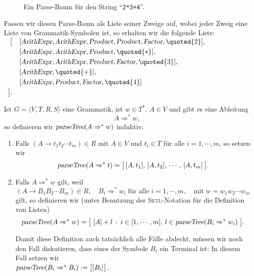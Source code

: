 \begin{figure}[!ht]
  \centering
  \caption{Ein Parse-Baum f\"ur den String ``\texttt{2*3+4}''.}
  \label{fig:parse-tree.dot2}
\end{figure}

Fassen wir diesen Parse-Baum als Liste seiner
Zweige auf, wobei jeder Zweig eine Liste von Grammatik-Symbolen ist, so erhalten wir die folgende Liste:
\\[0.2cm]
\hspace*{1.3cm}
$
\begin{array}[t]{rl}
  \bigl[ 
 & [ \textsl{ArithExpr}, \textsl{ArithExpr}, \textsl{Product}, \textsl{Product}, \textsl{Factor}, \quoted{2} ],
   \\[0.1cm] 
 & [ \textsl{ArithExpr}, \textsl{ArithExpr}, \textsl{Product}, \quoted{*} ],
   \\[0.1cm] 
 & [ \textsl{ArithExpr}, \textsl{ArithExpr}, \textsl{Product}, \textsl{Factor}, \quoted{3} ],
   \\[0.1cm] 
 & [ \textsl{ArithExpr}, \quoted{+} ],
   \\[0.1cm] 
 & [ \textsl{ArithExpr}, \textsl{Product}, \textsl{Factor}, \quoted{4} ]
   \\[0.1cm] 
  \bigr].
\end{array}
$
\pagebreak

\begin{Definition} \lb
Ist $G = \langle V, T, R, S \rangle$ eine Grammatik, ist $w \in T^*$, $A \in V$ und  gibt es eine Ableitung
\[ A \Rightarrow^* w,  \]
so definieren wir $\textsl{parseTree}(A \Rightarrow^* w)$ induktiv:
\begin{enumerate}
\item Falls $(A \rightarrow t_1t_2 \cdots t_m)\in R$ mit $A \in V$ und $t_i \in T$ f\"ur alle
      $i=1,\cdots,m$, so setzen wir
      \[ \textsl{parseTree}(A \Rightarrow^*t) = \bigl[\, [A, t_1],\,  [A, t_2],\,\cdots,\,  [A, t_m]\, \bigr].  \]
\item Falls  $A \Rightarrow^* w$ gilt, weil
      \[ (A \rightarrow B_1B_2 \cdots B_m) \in R, \quad 
         B_i \Rightarrow^* w_i\; \mbox{f\"ur alle $i=1,\cdots,m$}, \quad
         \mbox{mit} \; w = w_1w_2 \cdots w_m
      \]
      gilt, so definieren wir (unter Benutzung der \textsc{Setl}-Notation f\"ur die Definition von Listen)
      \[ 
        \textsl{parseTree}(A \Rightarrow^*w)  =
        \bigl[\; [A] + l \,:\,
                 i \in [1, \cdots, m ],\, l \in \textsl{parseTree}(B_i \Rightarrow^* w_i) \;
        \bigr]. 
      \]

      Damit diese Definition auch tats\"achlich alle F\"alle abdeckt, m\"ussen wir noch den Fall
      diskutieren, dass  eines der Symbole $B_i$ ein Terminal ist: In diesem Fall setzen wir
      \\[0.2cm]
      \hspace*{1.3cm}
      $\textsl{parseTree}(B_i \Rightarrow^* B_i) := \bigl[ [B_i] \bigr]$.
\end{enumerate}
\end{Definition}

